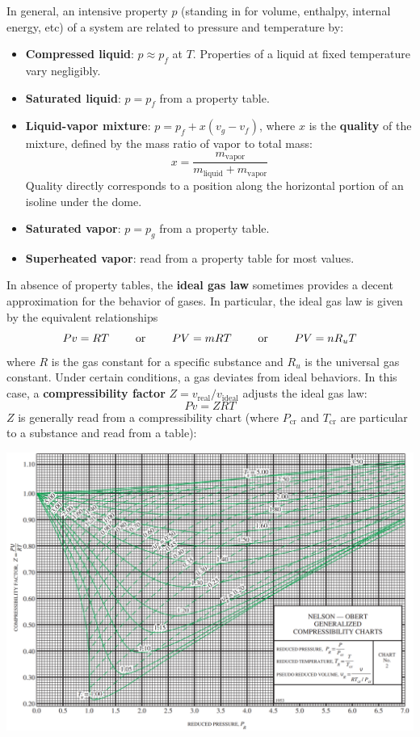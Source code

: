 \begin{shaded}
In general, an intensive property $p$ (standing in for volume, enthalpy, internal energy, etc) of a system are related to pressure and temperature by:
\begin{itemize}
    \item[] \textbf{Compressed liquid}: $p\approx p_{f}$ at $T$. Properties of a liquid at fixed temperature vary negligibly.
    \item[] \textbf{Saturated liquid}: $p=p_f$ from a property table.
    \item[] \textbf{Liquid-vapor mixture}: $p=p_f + x(v_g-v_f)$, where $x$ is the \textbf{quality} of the mixture, defined by the mass ratio of vapor to total mass: \[x=\frac{m_{\text{vapor}}}{m_\text{liquid}+m_\text{vapor}}\] Quality directly corresponds to a position along the horizontal portion of an isoline under the dome.
    \item[] \textbf{Saturated vapor}: $p=p_g$ from a property table.
    \item[] \textbf{Superheated vapor}: read from a property table for most values.
\end{itemize}
\end{shaded}

In absence of property tables, the \textbf{ideal gas law} sometimes provides a decent approximation for the behavior of gases. In particular, the ideal gas law is given by the equivalent relationships \[Pv=RT\hspace{0.325in}\text{or}\hspace{0.325in}PV=mRT\hspace{0.325in}\text{or}\hspace{0.325in}PV=nR_uT\] where $R$ is the gas constant for a specific substance and $R_u$ is the universal gas constant. Under certain conditions, a gas deviates from ideal behaviors. In this case, a \textbf{compressibility factor} $Z=v_\text{real}/v_\text{ideal}$ adjusts the ideal gas law: \[Pv=ZRT\] $Z$ is generally read from a compressibility chart (where $P_\text{cr}$ and $T_\text{cr}$ are particular to a substance and read from a table):
\begin{center}
\includegraphics[width=0.85\linewidth]{Images/thermo2.png}
\end{center}

